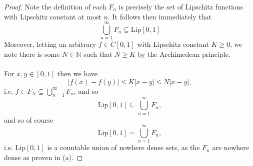 \documentclass[12pt]{article}
\newcommand{\N}{\mathbb{N}}
\newenvironment{ex}[2][Exercise]{\begin{trivlist}
\item[\hskip \labelsep {\bfseries #1}\hskip \labelsep {\bfseries #2.}]}{\end{trivlist}}
\begin{document}
\begin{ex}{16}
\begin{enumerate}[label=(\alph*)]
    \begin{proof}
        Note the definition of each $F_n$ is precisely the set of Lipschitz functions with Lipschitz constant at most $n$. It follows then immediately that 
        $$\bigcup_{n = 1}^\infty F_n \subseteq \text{Lip}[0,1]$$
        Moreover, letting an arbitrary $f \in C[0,1]$ with Lipschitz constant $K \geq 0$, we note there is some $N \in \N$ such that $N \geq K$ by the Archimedean principle. \\ \\
        For $x, y \in [0,1]$ then we have 
        $$|f(x) - f(y)| \leq K|x - y| \leq N|x - y|,$$
        i.e. $f \in F_N \subseteq \bigcup_{n = 1}^\infty F_n$, and so 
        $$\text{Lip}[0,1] \subseteq \bigcup_{n = 1}^\infty F_n,$$
        and so of course
        $$\text{Lip}[0,1] = \bigcup_{n = 1}^\infty F_n,$$
        i.e. $\text{Lip}[0,1]$ is a countable union of nowhere dense sets, as the $F_n$ are nowhere dense as proven in (a).
    \end{proof}
    \end{enumerate}
\end{ex}
\end{document}
